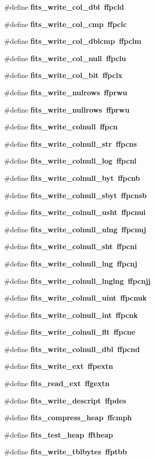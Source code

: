 \begin{CompactItemize}
\#define \bf{fits\_\-write\_\-col\_\-dbl}~ffpcld
\item 
\#define \bf{fits\_\-write\_\-col\_\-cmp}~ffpclc
\item 
\#define \bf{fits\_\-write\_\-col\_\-dblcmp}~ffpclm
\item 
\#define \bf{fits\_\-write\_\-col\_\-null}~ffpclu
\item 
\#define \bf{fits\_\-write\_\-col\_\-bit}~ffpclx
\item 
\#define \bf{fits\_\-write\_\-nulrows}~ffprwu
\item 
\#define \bf{fits\_\-write\_\-nullrows}~ffprwu
\item 
\#define \bf{fits\_\-write\_\-colnull}~ffpcn
\item 
\#define \bf{fits\_\-write\_\-colnull\_\-str}~ffpcns
\item 
\#define \bf{fits\_\-write\_\-colnull\_\-log}~ffpcnl
\item 
\#define \bf{fits\_\-write\_\-colnull\_\-byt}~ffpcnb
\item 
\#define \bf{fits\_\-write\_\-colnull\_\-sbyt}~ffpcnsb
\item 
\#define \bf{fits\_\-write\_\-colnull\_\-usht}~ffpcnui
\item 
\#define \bf{fits\_\-write\_\-colnull\_\-ulng}~ffpcnuj
\item 
\#define \bf{fits\_\-write\_\-colnull\_\-sht}~ffpcni
\item 
\#define \bf{fits\_\-write\_\-colnull\_\-lng}~ffpcnj
\item 
\#define \bf{fits\_\-write\_\-colnull\_\-lnglng}~ffpcnjj
\item 
\#define \bf{fits\_\-write\_\-colnull\_\-uint}~ffpcnuk
\item 
\#define \bf{fits\_\-write\_\-colnull\_\-int}~ffpcnk
\item 
\#define \bf{fits\_\-write\_\-colnull\_\-flt}~ffpcne
\item 
\#define \bf{fits\_\-write\_\-colnull\_\-dbl}~ffpcnd
\item 
\#define \bf{fits\_\-write\_\-ext}~ffpextn
\item 
\#define \bf{fits\_\-read\_\-ext}~ffgextn
\item 
\#define \bf{fits\_\-write\_\-descript}~ffpdes
\item 
\#define \bf{fits\_\-compress\_\-heap}~ffcmph
\item 
\#define \bf{fits\_\-test\_\-heap}~fftheap
\item 
\#define \bf{fits\_\-write\_\-tblbytes}~ffptbb
\item 

\end{CompactItemize}
